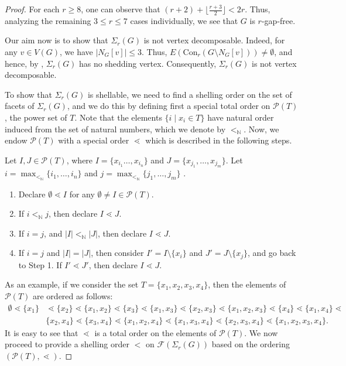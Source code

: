 \documentclass[10pt,a4paper]{amsart}
\newcommand{\Con}{{\mathrm{Con}}}
\begin{document}
	\begin{proof}
For each $r\ge 8$, one can observe that $(r+2)+\lfloor\frac{r+3}{2}\rfloor<2r$. Thus, analyzing the remaining $3\le r\le 7$ cases individually, we see that $G$ is $r$-gap-free. 
	
	Our aim now is to show that $\Sigma_r(G)$ is not vertex decomposable. Indeed, for any $v\in V(G)$, we have $|N_G[v]|\le 3$. Thus, $E(\Con_r(G\setminus N_G[v])) \neq \emptyset$, and hence, by , $\Sigma_r(G)$ has no shedding vertex. Consequently, $\Sigma_r(G)$ is not vertex decomposable.
    
		To show that $\Sigma_{r}(G)$ is shellable, we need to find a shelling order on the set of facets of $\Sigma_{r}(G)$, and we do this by defining first a special total order on $\mathcal P(T)$, the power set of $T$. Note that the elements $\{i\mid x_i\in T\}$ have natural order induced from the set of natural numbers, which we denote by $<_{\mathbb N}$. Now, we endow $\mathcal P(T)$ with a special order $\lessdot$ which is described in the following steps. 
		 
		 Let $I,J\in \mathcal P(T)$, where $I=\{x_{i_1}\ldots,x_{i_n}\}$ and $J=\{x_{j_1},\ldots,x_{j_m}\}$. Let $i=\max_{<_{\mathbb N}}\{i_1,\ldots,i_n\}$ and $j=\max_{<_{\mathbb N}}\{j_1,\ldots,j_m\}$ .
		 
		 \begin{enumerate}
		 	\item[{\bf Step 0:}] Declare $\emptyset\lessdot I$ for any $\emptyset\neq I\in \mathcal P(T)$.
		 	
		 	\item[{\bf Step 1:}] If $i<_{\mathbb N}j$, then declare $I\lessdot J$.
		 	
		 	\item[{\bf Step 2:}] If $i=j$, and $|I|<_{\mathbb N} |J|$, then declare $I\lessdot J$.
		 	
		 	\item[{\bf Step 3:}] If $i=j$ and $|I|=|J|$, then consider $I'=I\setminus\{x_i\}$ and $J'=J\setminus\{x_j\}$, and go back to Step 1. If $I'\lessdot J'$, then declare $I\lessdot J$.
		 \end{enumerate}
		As an example, if we consider the set $T=\{x_1,x_2,x_3,x_4\}$, then the elements of $\mathcal P(T)$ are ordered as follows:
		 \begin{align*}
		 \emptyset\lessdot\{x_1\}&\lessdot\{x_2\}\lessdot\{x_1,x_2\}\lessdot\{x_3\}\lessdot\{x_1,x_3\}\lessdot\{x_2,x_3\}\lessdot\{x_1,x_2,x_3\}\lessdot\{x_4\}\lessdot\{x_1,x_4\}\lessdot\\
		 &\{x_2,x_4\}\lessdot\{x_3,x_4\}\lessdot\{x_1,x_2,x_4\}\lessdot\{x_1,x_3,x_4\}\lessdot\{x_2,x_3,x_4\}\lessdot\{x_1,x_2,x_3,x_4\}.
		 \end{align*}
		 It is easy to see that $\lessdot$ is a total order on the elements of $\mathcal P(T)$. We now proceed to provide a shelling order $<$ on $\mathcal F(\Sigma_{r}(G))$ based on the ordering $(\mathcal P(T),\lessdot)$.
		 

\end{proof}
\end{document}

